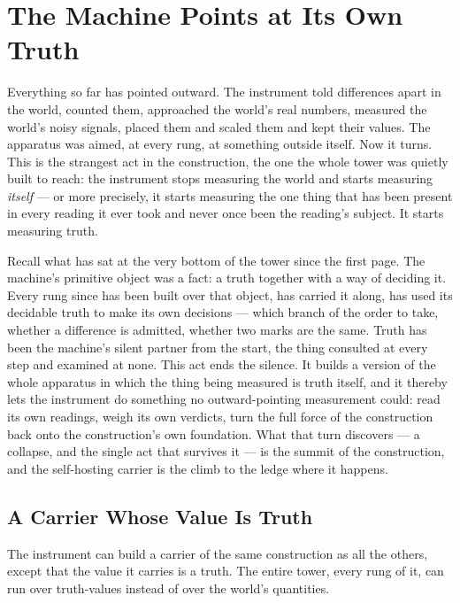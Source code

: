 \chapter{The Machine Points at Its Own Truth}

Everything so far has pointed outward. The instrument told differences apart in the world, counted them, approached
the world's real numbers, measured the world's noisy signals, placed them and scaled them and kept their values.
The apparatus was aimed, at every rung, at something outside itself. Now it turns. This is the strangest act in
the construction, the one the whole tower was quietly built to reach: the instrument stops measuring
the world and starts measuring \emph{itself} --- or more precisely, it starts measuring the one thing that has
been present in every reading it ever took and never once been the reading's subject. It starts measuring truth.

Recall what has sat at the very bottom of the tower since the first page. The machine's primitive object was a
fact: a truth together with a way of deciding it. Every rung since has been built over that object, has carried it
along, has used its decidable truth to make its own decisions --- which branch of the order to take, whether a
difference is admitted, whether two marks are the same. Truth has been the machine's silent partner from the
start, the thing consulted at every step and examined at none. This act ends the silence. It builds a version of
the whole apparatus in which the thing being measured is truth itself, and it thereby lets the instrument do
something no outward-pointing measurement could: read its own readings, weigh its own verdicts, turn the full
force of the construction back onto the construction's own foundation. What that turn discovers --- a collapse,
and the single act that survives it --- is the summit of the construction, and the self-hosting carrier is the
climb to the ledge where it happens.

\section{A Carrier Whose Value Is Truth}

The instrument can build a carrier of the same construction as all the others, except that the value it carries
is a truth. The entire tower, every rung of it, can run over truth-values instead of over the world's quantities.

